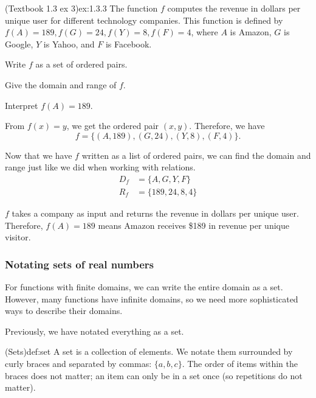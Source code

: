 \documentclass{article}
\begin{document}
\begin{example}{(Textbook 1.3 ex 3)}{ex:1.3.3}
    The function \(f\) computes the revenue in dollars per unique user for different technology companies. This function is defined by \(f(A)=189,f(G)=24,f(Y)=8,f(F)=4\), where \(A\) is Amazon, $G$ is Google, $Y$ is Yahoo, and $F$ is Facebook.
    \begin{problem}
        \item Write $f$ as a set of ordered pairs.
        \item Give the domain and range of $f$.
        \item Interpret $f(A)=189$.
    \end{problem}
\end{example}
\begin{solution}
    \begin{problem}
        \item From $f(x)=y$, we get the ordered pair $(x,y)$. Therefore, we have \[f=\{(A,189), (G,24), (Y,8), (F,4)\}.\]
        \item Now that we have $f$ written as a list of ordered pairs, we can find the domain and range just like we did when working with relations.
        \begin{align*}
            D_f&=\{A,G,Y,F\}\\
            R_f&=\{189,24,8,4\}
        \end{align*}
        \item $f$ takes a company as input and returns the revenue in dollars per unique user. Therefore, $f(A)=189$ means Amazon receives \$189 in revenue per unique visitor.
    \end{problem}
\end{solution}

\subsubsection{Notating sets of real numbers}

For functions with finite domains, we can write the entire domain as a set. However, many functions have infinite domains, so we need more sophisticated ways to describe their domains.

Previously, we have notated everything as a set.

\begin{definition}{(Sets)}{def:set}
    A set is a collection of elements. We notate them surrounded by curly braces and separated by commas: $\{a,b,c\}$. The order of items within the braces does not matter; an item can only be in a set once (so repetitions do not matter).
\end{definition}
\end{document}
